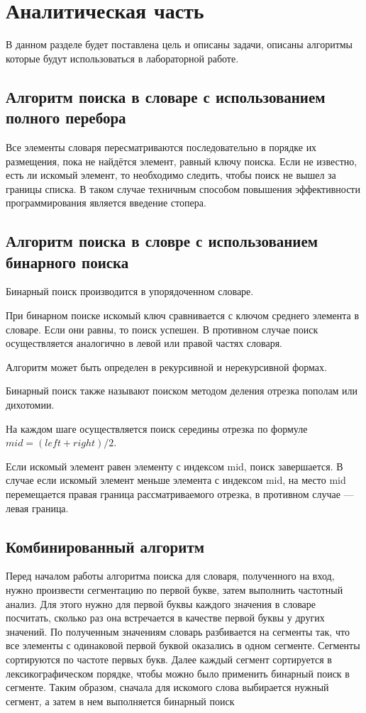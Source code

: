 \documentclass[12pt]{report}
\begin{document}
\chapter{Аналитическая часть}

В данном разделе будет поставлена цель и описаны задачи, описаны алгоритмы которые будут использоваться в лабораторной работе.

\section{Алгоритм поиска в словаре с использованием полного перебора}

Все элементы словаря пересматриваются последовательно в порядке их размещения, пока не найдётся элемент, равный ключу поиска. Если не известно, есть ли искомый элемент, то необходимо следить, чтобы поиск не вышел за границы списка. В таком случае техничным способом повышения эффективности программирования является введение стопера.

\section{Алгоритм поиска в словре с использованием бинарного поиска}

Бинарный поиск производится в упорядоченном словаре.

При бинарном поиске искомый ключ сравнивается с ключом среднего элемента в словаре. Если они равны, то поиск успешен. В противном случае поиск осуществляется аналогично в левой или правой частях словаря.

Алгоритм может быть определен в рекурсивной и нерекурсивной формах.

Бинарный поиск также называют поиском методом деления отрезка пополам или дихотомии.

На каждом шаге осуществляется поиск середины отрезка по формуле $mid = (left + right) / 2$.

Если искомый элемент равен элементу с индексом mid, поиск завершается.
В случае если искомый элемент меньше элемента с индексом mid, на место mid перемещается правая граница рассматриваемого отрезка, в противном случае — левая граница.


\section{Комбинированный алгоритм}

Перед началом работы алгоритма поиска для словаря, полученного на вход, нужно произвести сегментацию по первой букве, затем выполнить частотный анализ. Для этого нужно для первой буквы каждого значения в словаре посчитать, сколько раз она встречается в качестве первой буквы у других значений. По полученным значениям словарь разбивается на сегменты так, что все элементы с одинаковой первой буквой оказались в одном сегменте. Сегменты сортируются по частоте первых букв. Далее каждый сегмент сортируется в лексикографическом порядке, чтобы можно было применить бинарный поиск в сегменте. Таким образом, сначала для искомого слова выбирается нужный сегмент, а затем в нем выполняется бинарный поиск
\end{document}
